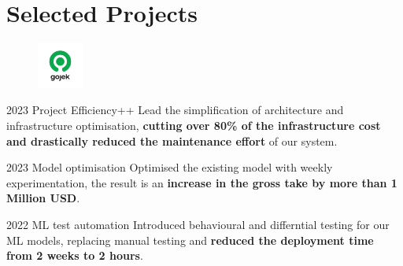 \documentclass{tccv}
\begin{document}





\section{Selected Projects}

\begin{figure}[h!] %
  \centering
  \includegraphics[width=1.5cm,height=1.5cm]{../company_icon/gojek.jpeg}
\end{figure}

\begin{yearlist}
\item{2023} {Project Efficiency++} {Lead the simplification of architecture and
  infrastructure optimisation, \textbf{cutting over 80\% of the infrastructure cost and
  drastically reduced the maintenance effort} of our system.}

\item{2023} {Model optimisation} {Optimised the existing model with weekly
  experimentation, the result is an \textbf{increase in the gross take by more than
    1 Million USD}.}

\item{2022} {ML test automation} {Introduced behavioural and differntial testing
  for our ML models, replacing manual testing and \textbf{reduced the deployment
    time from 2 weeks to 2 hours}.}

\end{yearlist}
\end{document}
